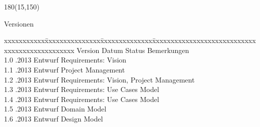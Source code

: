 
\begin{textblock}{180}(15,150)
\color{black}
\begin{huge}
Versionen
\end{huge}
\vspace{10mm}

\fontsize{10pt}{18pt}\selectfont
\begin{tabbing}
xxxxxxxxxxx\=xxxxxxxxxxxxxxx\=xxxxxxxxxxxxxx\=xxxxxxxxxxxxxxxxxxxxxxxxxxxxxxxxxxxxxxxxxxxxxxx \kill
Version	\> Datum	\> Status		\> Bemerkungen \\
1.0	.2013	\> Entwurf		\> Requirements: Vision \\
1.1	.2013	\> Entwurf		\> Project Management \\
1.2	.2013	\> Entwurf		\> Requirements: Vision, Project Management \\
1.3	.2013	\> Entwurf		\> Requirements: Use Cases Model \\
1.4	.2013	\> Entwurf		\> Requirements: Use Cases Model \\
1.5	.2013	\> Entwurf		\> Domain Model \\
1.6	.2013	\> Entwurf		\> Design Model \\
\end{tabbing}

\end{textblock}

